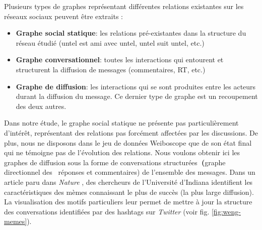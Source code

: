 Plusieurs types de graphes représentant différentes relations existantes sur les réseaux sociaux peuvent \^etre extraits :

\begin{itemize}
    \item \textbf{Graphe social statique}: les relations pré-existantes dans la structure du réseau étudié (untel est ami avec untel, untel suit untel, etc.)
    \item \textbf{Graphe conversationnel}: toutes les interactions qui entourent et structurent la diffusion de messages (commentaires, RT, etc.)
    \item \textbf{Graphe de diffusion}: les interactions qui se sont produites entre les acteurs durant la diffusion du message. Ce dernier type de graphe est un recoupement des deux autres.
\end{itemize}




Dans notre étude, le graphe social statique ne présente pas particulièrement d{\textquoteright}intér\^et, représentant des relations pas forcément affectées par les discussions. De plus, nous ne disposons dans le jeu de données Weiboscope que de son état final qui ne témoigne pas de l{\textquoteright}évolution des relations. Nous voulons obtenir ici les graphes de diffusion sous la forme de conversations structurées\textbf{~(}graphe directionnel des \ réponses et commentaires) de l{\textquoteright}ensemble des messages. Dans un article paru dans \textit{Nature} \citep{Weng2012}, des chercheurs de l{\textquoteright}Université d{\textquoteright}Indiana identifient les caractéristiques des mèmes connaissant le plus de succès (la plus large diffusion). La visualisation des motifs particuliers leur permet de mettre à jour la structure des conversations identifiées par des hashtags sur \textit{Twitter} (voir fig. \ref{fig:weng-memes}).


